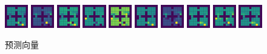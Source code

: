 \begin{figure}[h!]
    \\
    \includegraphics[width=0.09\textwidth]{image/chap04/prediction/10.png}
    \includegraphics[width=0.09\textwidth]{image/chap04/prediction/11.png}
    \includegraphics[width=0.09\textwidth]{image/chap04/prediction/12.png}
    \includegraphics[width=0.09\textwidth]{image/chap04/prediction/13.png}
    \includegraphics[width=0.09\textwidth]{image/chap04/prediction/14.png}
    \includegraphics[width=0.09\textwidth]{image/chap04/prediction/15.png}
    \includegraphics[width=0.09\textwidth]{image/chap04/prediction/16.png}
    \includegraphics[width=0.09\textwidth]{image/chap04/prediction/17.png}
    \includegraphics[width=0.09\textwidth]{image/chap04/prediction/18.png}
    \includegraphics[width=0.09\textwidth]{image/chap04/prediction/19.png}
    \caption{预测向量}
    \label{fig:prediction}
\end{figure}

